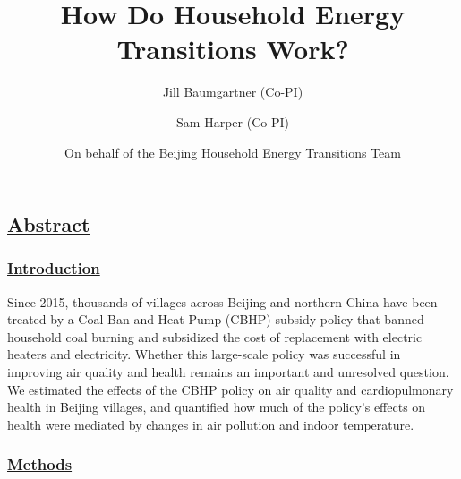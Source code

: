 \documentclass[
  letterpaper,
  DIV=11,
  numbers=noendperiod]{scrartcl}
\title{How Do Household Energy Transitions Work?}
\author{Jill Baumgartner (Co-PI) \and Sam Harper (Co-PI) \and On behalf
of the Beijing Household Energy Transitions Team}
\date{\DIFdelbegin \DIFdel{2024-04-27}\DIFdelend \DIFaddbegin \DIFadd{2024-07-30}\DIFaddend }
\renewcommand*\contentsname{Table of contents}
\newcommand\contentsname{Table of contents}
\providecommand{\DIFadd}[1]{{\protect\color{blue}\underline{#1}}} %
\providecommand{\DIFaddbegin}{} %
\providecommand{\DIFaddend}{} %
\providecommand{\DIFdelbegin}{} %
\providecommand{\DIFdelend}{} %
\newcommand{\DIFscaledelfig}{0.5}
\newlength{\DIFdelgraphicswidth} %
\newlength{\DIFdelgraphicsheight} %
\newcommand{\DIFaddincludegraphics}[2][]{{\color{blue}\fbox{\DIFOincludegraphics[#1]{#2}}}} %
\newcommand{\DIFdelincludegraphics}[2][]{%
\sbox{\DIFdelgraphicsbox}{\DIFOincludegraphics[#1]{#2}}%
\settoboxwidth{\DIFdelgraphicswidth}{\DIFdelgraphicsbox} %
\settoboxtotalheight{\DIFdelgraphicsheight}{\DIFdelgraphicsbox} %
\scalebox{\DIFscaledelfig}{%
\parbox[b]{\DIFdelgraphicswidth}{\usebox{\DIFdelgraphicsbox}\\[-\baselineskip] \rule{\DIFdelgraphicswidth}{0em}}\llap{\resizebox{\DIFdelgraphicswidth}{\DIFdelgraphicsheight}{%
\setlength{\unitlength}{\DIFdelgraphicswidth}%
\begin{picture}(1,1)%
\thicklines\linethickness{2pt} %
{\color[rgb]{1,0,0}\put(0,0){\framebox(1,1){}}}%
{\color[rgb]{1,0,0}\put(0,0){\line( 1,1){1}}}%
{\color[rgb]{1,0,0}\put(0,1){\line(1,-1){1}}}%
\end{picture}%
}\hspace*{3pt}}} %
} %
\DeclareRobustCommand{\DIFaddbegin}{\DIFOaddbegin \let\includegraphics\DIFaddincludegraphics} %
\DeclareRobustCommand{\DIFaddend}{\DIFOaddend \let\includegraphics\DIFOincludegraphics} %
\DeclareRobustCommand{\DIFdelbegin}{\DIFOdelbegin \let\includegraphics\DIFdelincludegraphics} %
\DeclareRobustCommand{\DIFdelend}{\DIFOaddend \let\includegraphics\DIFOincludegraphics} %
\begin{document}
\maketitle
\DIFdelbegin %
\DIFdelend 

\renewcommand*\contentsname{Table of contents}
{
\hypersetup{linkcolor=}
\setcounter{tocdepth}{3}
\tableofcontents
}
\DIFdelbegin %
\DIFdelend 

\DIFdelbegin %
\DIFdelend \DIFaddbegin \subsection*{\DIFadd{Abstract}}\label{abstract}
\DIFaddend 

\DIFaddbegin \subsubsection*{\DIFadd{Introduction}}\label{introduction}

\DIFaddend Since 2015, thousands of villages across Beijing and northern China have
been treated by a Coal Ban and Heat Pump (CBHP) subsidy policy that
banned household coal burning and subsidized the cost of replacement
with electric heaters and electricity. Whether this large-scale policy
was successful in improving air quality and health remains an important
and unresolved question. We estimated the effects of the CBHP policy on
air quality and cardiopulmonary health in Beijing villages, and
quantified how much of the policy's effects on health were mediated by
changes in air pollution and indoor temperature.

\DIFdelbegin %
\DIFdelend \DIFaddbegin \subsubsection*{\DIFadd{Methods}}\label{methods}
\DIFaddend 
\end{document}

